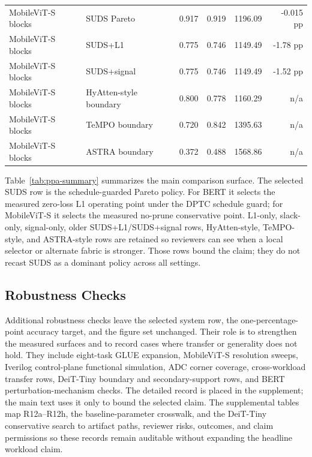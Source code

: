 \documentclass[10pt,journal]{IEEEtran}
\begin{document}
\begin{table}[t]
\begin{tabular}{llrrrr}
MobileViT-S blocks & SUDS Pareto & 0.917 & 0.919 & 1196.09 & -0.015 pp \\
MobileViT-S blocks & SUDS+L1 & 0.775 & 0.746 & 1149.49 & -1.78 pp \\
MobileViT-S blocks & SUDS+signal & 0.775 & 0.746 & 1149.49 & -1.52 pp \\
MobileViT-S blocks & HyAtten-style boundary & 0.800 & 0.778 & 1160.29 & n/a \\
MobileViT-S blocks & TeMPO boundary & 0.720 & 0.842 & 1395.63 & n/a \\
MobileViT-S blocks & ASTRA boundary & 0.372 & 0.488 & 1568.86 & n/a \\
\bottomrule
\end{tabular}
\end{table}

Table~\ref{tab:ppa-summary} summarizes the main comparison surface. The
selected SUDS row is the schedule-guarded Pareto policy. For BERT it selects
the measured zero-loss L1 operating point under the DPTC schedule guard; for
MobileViT-S it selects the measured no-prune conservative point. L1-only,
slack-only, signal-only, older SUDS+L1/SUDS+signal rows, HyAtten-style,
TeMPO-style, and ASTRA-style rows are retained so reviewers can see when a
local selector or alternate fabric is stronger. Those rows bound the claim;
they do not recast SUDS as a dominant policy across all settings.

\subsection{Robustness Checks}

Additional robustness checks leave the selected system row, the
one-percentage-point accuracy target, and the figure set unchanged. Their role
is to strengthen the measured surfaces and to record cases where transfer or
generality does not hold. They include eight-task GLUE expansion, MobileViT-S
resolution sweeps, Iverilog control-plane functional simulation, ADC corner
coverage, cross-workload transfer rows, DeiT-Tiny boundary and secondary-support
rows, and BERT perturbation-mechanism checks. The detailed record is placed in
the supplement; the main text uses it only to bound the selected claim. The
supplemental tables map R12a--R12h, the baseline-parameter crosswalk, and the
DeiT-Tiny conservative search to artifact paths, reviewer risks, outcomes, and
claim permissions so these records remain auditable without expanding the
headline workload claim.
\end{document}
